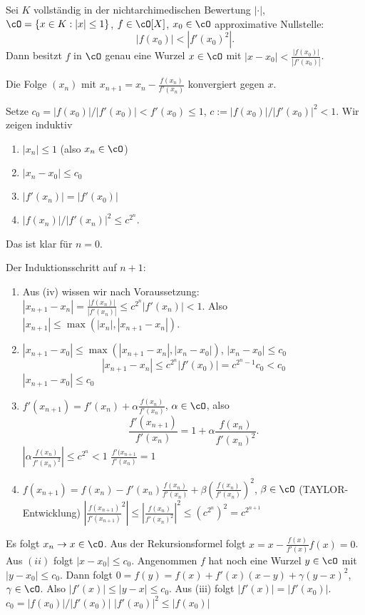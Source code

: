 \renewcommand{\lecdate}{21.01.2015}

\begin{Satz}
 Sei $K$ vollständig in der nichtarchimedischen Bewertung $|\cdot|$, $\cO=\{x\in K: |x|\leq 1\}$, $f\in\cO[X]$, $x_0\in\cO$ approximative Nullstelle:
 \[ |f(x_0)|<|f'(x_0)^2|.\]
 Dann besitzt $f$ in $\cO$ genau eine Wurzel $x\in\cO$ mit $|x-x_0|<\frac{|f(x_0)|}{|f'(x_0)|}$.
 
 Die Folge $(x_n)$ mit $x_{n+1}=x_n-\frac{f(x_n)}{f'(x_n)}$ konvergiert gegen $x$.
\end{Satz}

\begin{Beweis}
 Setze $c_0=|f(x_0)|/|f'(x_0)|<f'(x_0)\leq 1$, $c:=|f(x_0)|/|f'(x_0)|^2<1$. Wir zeigen induktiv
 \begin{enumerate}
  \item $|x_n|\leq 1$ (also $x_n\in\cO$)
  \item $|x_n-x_0|\leq c_0$
  \item $|f'(x_n)|=|f'(x_0)|$
  \item $|f(x_n)|/|f'(x_n)|^2\leq c^{2^n}$.
 \end{enumerate}
Das ist klar für $n=0$.
 
 Der Induktionsschritt auf $n+1$:
 \begin{enumerate}
  \item Aus (iv) wissen wir nach Voraussetzung: $|x_{n+1}-x_n|=\frac{|f(x_n)|}{|f'(x_n)|}\leq c^{2^n}|f'(x_n)|<1$. Also $|x_{n+1}|\leq \max(|x_n|,|x_{n+1}-x_n|)$.
  \item $|x_{n+1}-x_0|\leq \max(|x_{n+1}-x_n|, |x_n-x_0|)$, $|x_n-x_0|\leq c_0$
  \[ |x_{n+1}-x_n|\leq c^{2^n}|f'(x_0)|=c^{2^n-1}c_0<c_0\]
  \folge $|x_{n+1}-x_0|\leq c_0$
  \item $f'(x_{n+1})=f'(x_n)+\alpha\frac{f(x_n)}{f'(x_n)}$, $\alpha\in\cO$, also
  \[ \frac{f'(x_{n+1})}{f'(x_n)}=1+\alpha\frac{f(x_n)}{f'(x_n)^2}.\]
  $|\alpha \frac{f(x_n)}{f'(x_n)^2}|\leq c^{2^n}<1$ \folge $\frac{f'(x_{n+1}}{f'(x_n)}=1$
  \item $f(x_{n+1})=f(x_n)-f'(x_n)\frac{f(x_n)}{f'(x_n)}+\beta (\frac{f(x_n)}{f'(x_n)})^2$, $\beta\in\cO$ (TAYLOR-Entwicklung)
  \folge $\left| \frac{f(x_{n+1})}{f'(x_{n+1})}^2\right|\leq \left| \frac{f(x_n)}{f'(x_n)^2}\right|^2\leq (c^{2^n})^2=c^{2^{n+1}}$
 \end{enumerate}

 Es folgt $x_n\rightarrow x\in\cO$. Aus der Rekursionsformel folgt $x=x-\frac{f(x)}{f'(x)}$\folge $f(x)=0$. Aus $(ii)$ folgt $|x-x_0|\leq c_0$. Angenommen $f$ hat noch eine Wurzel $y\in\cO$ mit $|y-x_0|\leq c_0$. Dann folgt $0=f(y)=f(x)+f'(x)(x-y)+\gamma (y-x)^2$, $\gamma\in\cO$. Also $|f'(x)|\leq |y-x|\leq c_0$. Aus (iii) folgt $|f'(x)|=|f'(x_0)|$. $c_0=|f(x_0)|/|f'(x_0)|$ \folge $|f'(x_0)|^2\leq |f(x_0)|$ \lightning
\end{Beweis}

